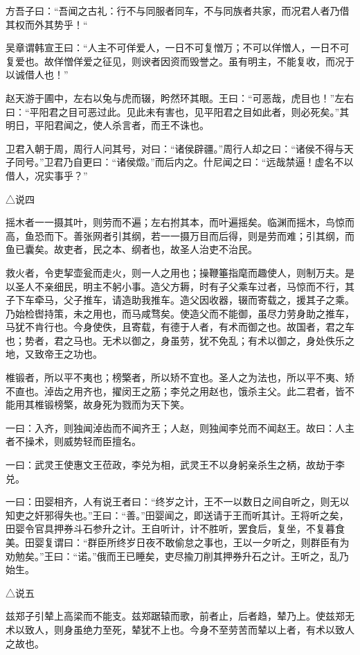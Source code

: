 \documentclass[]{article}
\begin{document}
方吾子曰：``吾闻之古礼：行不与同服者同车，不与同族者共家，而况君人者乃借其权而外其势乎！``

吴章谓韩宣王曰：``人主不可佯爱人，一日不可复憎万；不可以佯憎人，一日不可复爱也。故佯憎佯爱之征见，则谀者因资而毁誉之。虽有明主，不能复收，而况于以诚借人也！''

赵天游于圃中，左右以兔与虎而辍，盻然环其眼。王曰：``可恶哉，虎目也！''左右曰：``平阳君之目可恶过此。见此未有害也，见平阳君之目如此者，则必死矣。''其明日，平阳君闻之，使人杀言者，而王不诛也。

卫君入朝于周，周行人问其号，对曰：``诸侯辟疆。''周行人却之曰：``诸侯不得与天子同号。''卫君乃自更曰：``诸侯燬。''而后内之。什尼闻之曰：``远哉禁逼！虚名不以借人，况实事乎？''

△说四

摇木者一一摄其叶，则劳而不遍；左右拊其本，而叶遍摇矣。临渊而摇木，鸟惊而高，鱼恐而下。善张网者引其纲，若一一摄万目而后得，则是劳而难；引其纲，而鱼已囊矣。故吏者，民之本、纲者也，故圣人治吏不治民。

救火者，令吏挈壶瓮而走火，则一人之用也；操鞭箠指麾而趣使人，则制万夫。是以圣人不亲细民，明主不躬小事。造父方耨，时有子父乘车过者，马惊而不行，其子下车牵马，父子推车，请造助我推车。造父因收器，辍而寄载之，援其子之乘。乃始检辔持策，未之用也，而马咸骛矣。使造父而不能御，虽尽力劳身助之推车，马犹不肯行也。今身使佚，且寄载，有德于人者，有术而御之也。故国者，君之车也；势者，君之马也。无术以御之，身虽劳，犹不免乱；有术以御之，身处佚乐之地，又致帝王之功也。

椎锻者，所以平不夷也；榜檠者，所以矫不宜也。圣人之为法也，所以平不夷、矫不直也。淖齿之用齐也，擢闵王之筋；李兑之用赵也，饿杀主父。此二君者，皆不能用其椎锻榜檠，故身死为戮而为天下笑。

一曰：入齐，则独闻淖齿而不闻齐王；人赵，则独闻李兑而不闻赵王。故曰：人主者不操术，则威势轻而臣擅名。

一曰：武灵王使惠文王莅政，李兑为相，武灵王不以身躬亲杀生之柄，故劫于李兑。

一曰：田婴相齐，人有说王者曰：``终岁之计，王不一以数日之间自听之，则无以知吏之奸邪得失也。''王曰：``善。''田婴闻之，即送请于王而听其计。王将听之矣，田婴令官具押券斗石参升之计。王自听计，计不胜听，罢食后，复坐，不复暮食美。田婴复谓曰：``群臣所终岁日夜不敢偷怠之事也，王以一夕听之，则群臣有为劝勉矣。''王曰：``诺。''俄而王已睡矣，吏尽揄刀削其押券升石之计。王听之，乱乃始生。

△说五

兹郑子引辇上高梁而不能支。兹郑踞辕而歌，前者止，后者趋，辇乃上。使兹郑无术以致人，则身虽绝力至死，辇犹不上也。今身不至劳苦而辇以上者，有术以致人之故也。
\end{document}
